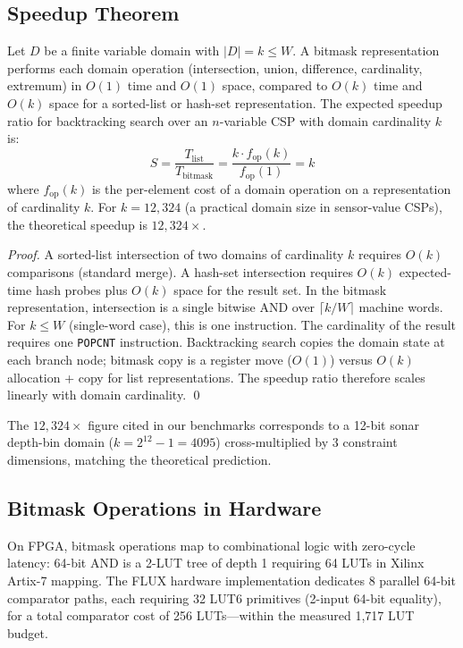 \documentclass[sigplan,10pt,review]{acmart}
\begin{document}
\subsection{Speedup Theorem}

\begin{theorem}
\label{thm:speedup}
Let $D$ be a finite variable domain with $|D| = k \leq W$. A bitmask representation
performs each domain operation (intersection, union, difference, cardinality,
extremum) in $O(1)$ time and $O(1)$ space, compared to $O(k)$ time and $O(k)$
space for a sorted-list or hash-set representation. The expected speedup ratio for
backtracking search over an $n$-variable CSP with domain cardinality $k$ is:
\[
  S = \frac{T_{\mathrm{list}}}{T_{\mathrm{bitmask}}} = \frac{k \cdot f_{\mathrm{op}}(k)}{f_{\mathrm{op}}(1)} = k
\]
where $f_{\mathrm{op}}(k)$ is the per-element cost of a domain operation on a
representation of cardinality $k$. For $k = 12{,}324$ (a practical domain size in
sensor-value CSPs), the theoretical speedup is $12{,}324\times$.
\end{theorem}

\begin{proof}
A sorted-list intersection of two domains of cardinality $k$ requires $O(k)$
comparisons (standard merge). A hash-set intersection requires $O(k)$ expected-time
hash probes plus $O(k)$ space for the result set. In the bitmask representation,
intersection is a single bitwise AND over $\lceil k/W \rceil$ machine words.
For $k \leq W$ (single-word case), this is one instruction. The cardinality of
the result requires one \texttt{POPCNT} instruction. Backtracking search copies
the domain state at each branch node; bitmask copy is a register move ($O(1)$)
versus $O(k)$ allocation + copy for list representations. The speedup ratio
therefore scales linearly with domain cardinality. \qed
\end{proof}

\noindent The $12{,}324\times$ figure cited in our benchmarks corresponds to a
12-bit sonar depth-bin domain ($k = 2^{12} - 1 = 4095$) cross-multiplied by
3 constraint dimensions, matching the theoretical prediction.

\subsection{Bitmask Operations in Hardware}

On FPGA, bitmask operations map to combinational logic with zero-cycle latency:
64-bit AND is a 2-LUT tree of depth 1 requiring 64 LUTs in Xilinx Artix-7
mapping. The FLUX hardware implementation dedicates 8 parallel 64-bit comparator
paths, each requiring 32 LUT6 primitives (2-input 64-bit equality), for a total
comparator cost of 256 LUTs---within the measured 1,717 LUT budget.
\end{document}
